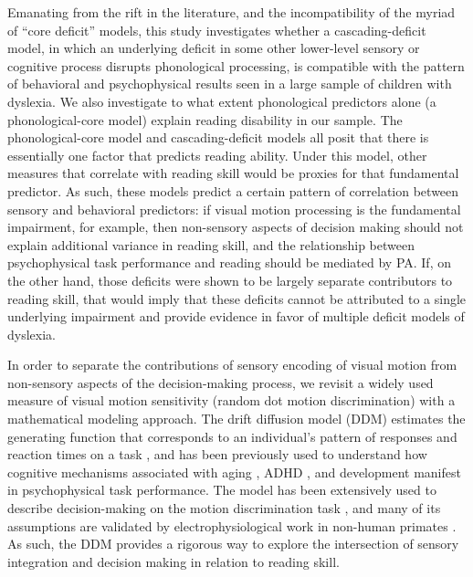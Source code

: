 \documentclass[../uwthesis.tex]{subfiles}
\begin{document}
Emanating from the rift in the literature, and the incompatibility of the myriad of “core deficit” models, this study investigates whether a cascading-deficit model, in which an underlying deficit in some other lower-level sensory or cognitive process disrupts phonological processing, is compatible with the pattern of behavioral and psychophysical results seen in a large sample of children with dyslexia. We also investigate to what extent phonological predictors alone (a phonological-core model) explain reading disability in our sample. The phonological-core model and cascading-deficit models all posit that there is essentially one factor that predicts reading ability. Under this model, other measures that correlate with reading skill would be proxies for that fundamental predictor. As such, these models predict a certain pattern of correlation between sensory and behavioral predictors: if visual motion processing is the fundamental impairment, for example, then non-sensory aspects of decision making should not explain additional variance in reading skill, and the relationship between psychophysical task performance and reading should be mediated by PA. If, on the other hand, those deficits were shown to be largely separate contributors to reading skill, that would imply that these deficits cannot be attributed to a single underlying impairment and provide evidence in favor of multiple deficit models of dyslexia.

In order to separate the contributions of sensory encoding of visual motion from non-sensory aspects of the decision-making process, we revisit a widely used measure of visual motion sensitivity (random dot motion discrimination) with a mathematical modeling approach. The drift diffusion model (DDM) estimates the generating function that corresponds to an individual’s pattern of responses and reaction times on a task \citep{Ratcliff2008TheTasks}, and has been previously used to understand how cognitive mechanisms associated with aging \citep{Ratcliff2004ATask}, ADHD \citep{Huang-Pollock2017UsingDisorder}, and development \citep{Ratcliff2012ChildrenResponses} manifest in psychophysical task performance. The model has been extensively used to describe decision-making on the motion discrimination task \citep{Gold2007TheMaking.,Palmer2005TheDecision,Shadlen2013ThePrimer}, and many of its assumptions are validated by electrophysiological work in non-human primates \citep{Shadlen2001NeuralMonkey}. As such, the DDM provides a rigorous way to explore the intersection of sensory integration and decision making in relation to reading skill.
\end{document}
